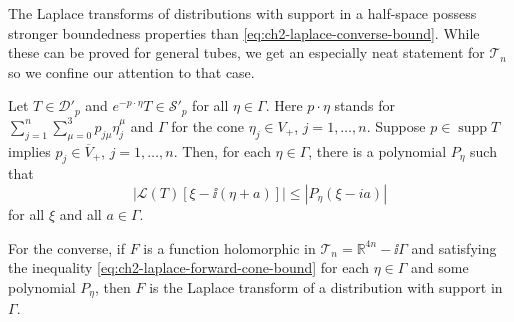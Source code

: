The Laplace transforms of distributions with support in a half-space
possess stronger boundedness properties than \eqref{eq:ch2-laplace-converse-bound}.  While these can
be proved for general tubes, we get an especially neat statement for
$\mathcal{T}_n$ so we confine our attention to that case.

\begin{theorem}[2-8]\label{thm:ch2-laplace-forward-cone}
Let $T\in\mathcal{D}'_p$ and $e^{-p\cdot\eta}T\in\mathcal{S}'_p$ for all
$\eta\in\Gamma$.  Here $p\cdot\eta$ stands for
$\sum_{j=1}^n\sum_{\mu=0}^3p_{j\mu}\eta_j^\mu$ and $\Gamma$ for the cone
$\eta_j\in V_+$, $j=1,\ldots,n$.  Suppose $p\in\operatorname{supp}T$ implies
$p_j\in\overline{V}_+$, $j=1,\ldots,n$.  Then, for each $\eta\in\Gamma$,
there is a polynomial $P_\eta$ such that
\begin{equation}
  |\mathcal{L}(T)[\xi-\ii(\eta+a)]|
  \leq |P_\eta(\xi-ia)|
  \tag{2-78}\label{eq:ch2-laplace-forward-cone-bound}
\end{equation}
for all $\xi$ and all $a\in\Gamma$.

For the converse, if $F$ is a function holomorphic in
$\mathcal{T}_n=\mathbb{R}^{4n}-\ii\Gamma$ and satisfying the inequality \eqref{eq:ch2-laplace-forward-cone-bound}
for each $\eta\in\Gamma$ and some polynomial $P_\eta$, then $F$ is the
Laplace transform of a distribution with support in $\Gamma$.
\end{theorem}

